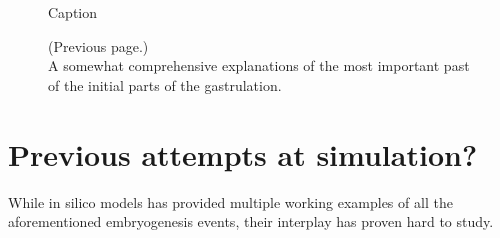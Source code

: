 \begin{figure}[H]
    \centering
    \vspace*{-1cm}
    \caption{Caption}
    \label{fig:big-timeline}
\end{figure}
\newpage
\addtocounter{figure}{-1}
\begin{figure} [t!]
  \caption{(Previous page.) \\ A somewhat comprehensive explanations of the most important past of the initial parts of the gastrulation.
  }
\end{figure}
\section{Previous attempts at simulation?}
While in silico models has provided multiple working examples of all the aforementioned embryogenesis events, their interplay has proven hard to study.

